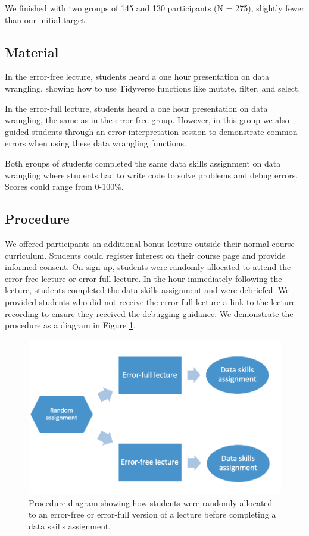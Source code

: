 \documentclass[
  man,floatsintext]{apa6}
\begin{document}
We finished with two groups of 145 and 130 participants (N = 275), slightly fewer than our initial target.

\hypertarget{material}{%
\subsection{Material}\label{material}}

In the error-free lecture, students heard a one hour presentation on data wrangling, showing how to use Tidyverse functions like mutate, filter, and select.

In the error-full lecture, students heard a one hour presentation on data wrangling, the same as in the error-free group. However, in this group we also guided students through an error interpretation session to demonstrate common errors when using these data wrangling functions.

Both groups of students completed the same data skills assignment on data wrangling where students had to write code to solve problems and debug errors. Scores could range from 0-100\%.

\hypertarget{procedure}{%
\subsection{Procedure}\label{procedure}}

We offered participants an additional bonus lecture outside their normal course curriculum. Students could register interest on their course page and provide informed consent. On sign up, students were randomly allocated to attend the error-free lecture or error-full lecture. In the hour immediately following the lecture, students completed the data skills assignment and were debriefed. We provided students who did not receive the error-full lecture a link to the lecture recording to ensure they received the debugging guidance. We demonstrate the procedure as a diagram in Figure \ref{fig:procedure-diagram}.



\begin{figure}
\includegraphics[width=1\linewidth]{Figures/procedure_diagram} \caption{Procedure diagram showing how students were randomly allocated to an error-free or error-full version of a lecture before completing a data skills assignment.}\label{fig:procedure-diagram}
\end{figure}
\end{document}
